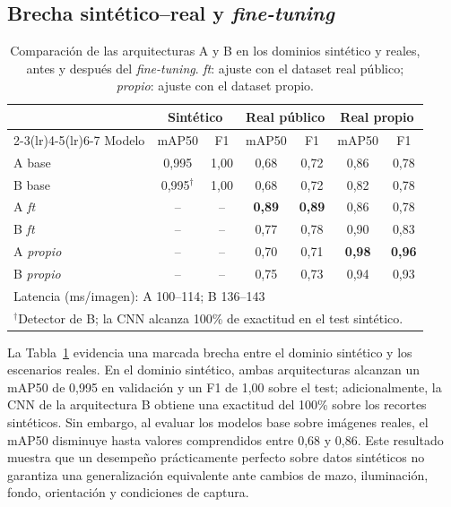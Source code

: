 \documentclass[conference,a4paper]{IEEEtran}
\begin{document}
\subsection{Brecha sintético--real y \textit{fine-tuning}}

\begin{table}[t]
\centering
\caption{Comparación de las arquitecturas A y B en los dominios sintético y reales, antes y después del \textit{fine-tuning}. \emph{ft}: ajuste con el dataset real público; \emph{propio}: ajuste con el dataset propio.}
\label{tab:dominios}
\setlength{\tabcolsep}{3.2pt}
\begin{tabular}{lcccccc}
\toprule
 & \multicolumn{2}{c}{Sintético} & \multicolumn{2}{c}{Real público} & \multicolumn{2}{c}{Real propio} \\
\cmidrule(lr){2-3}\cmidrule(lr){4-5}\cmidrule(lr){6-7}
Modelo & mAP50 & F1 & mAP50 & F1 & mAP50 & F1 \\
\midrule
A base       & 0,995 & 1,00 & 0,68 & 0,72 & 0,86 & 0,78 \\
B base       & 0,995$^\dagger$ & 1,00 & 0,68 & 0,72 & 0,82 & 0,78 \\
A \emph{ft}     & --    & --   & \textbf{0,89} & \textbf{0,89} & 0,86 & 0,78 \\
B \emph{ft}     & --    & --   & 0,77 & 0,78 & 0,90 & 0,83 \\
A \emph{propio} & --    & --   & 0,70 & 0,71 & \textbf{0,98} & \textbf{0,96} \\
B \emph{propio} & --    & --   & 0,75 & 0,73 & 0,94 & 0,93 \\
\midrule
\multicolumn{7}{l}{Latencia (ms/imagen): A 100--114; B 136--143} \\
\bottomrule
\multicolumn{7}{l}{\footnotesize $^\dagger$Detector de B; la CNN alcanza 100\% de exactitud en el test sintético.}
\end{tabular}
\end{table}

La Tabla~\ref{tab:dominios} evidencia una marcada brecha entre el dominio sintético y los escenarios reales. En el dominio sintético, ambas arquitecturas alcanzan un mAP50 de 0,995 en validación y un F1 de 1,00 sobre el test; adicionalmente, la CNN de la arquitectura B obtiene una exactitud del 100\% sobre los recortes sintéticos. Sin embargo, al evaluar los modelos base sobre imágenes reales, el mAP50 disminuye hasta valores comprendidos entre 0,68 y 0,86. Este resultado muestra que un desempeño prácticamente perfecto sobre datos sintéticos no garantiza una generalización equivalente ante cambios de mazo, iluminación, fondo, orientación y condiciones de captura.
\end{document}
